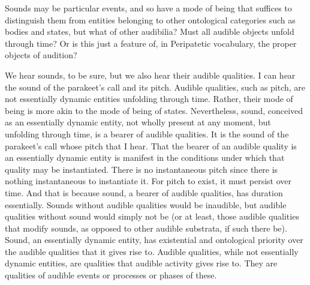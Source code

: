 \documentclass[12pt]{article}
\begin{document}
Sounds may be particular events, and so have a mode of being that suffices to distinguish them from entities belonging to other ontological categories such as bodies and states, but what of other audibilia? Must all audible objects unfold through time? Or is this just a feature of, in Peripatetic vocabulary, the proper objects of audition?

We hear sounds, to be sure, but we also hear their audible qualities. I can hear the sound of the parakeet’s call and its pitch. Audible qualities, such as pitch, are not essentially dynamic entities unfolding through time. Rather, their mode of being is more akin to the mode of being of states. Nevertheless, sound, conceived as an essentially dynamic entity, not wholly present at any moment, but unfolding through time, is a bearer of audible qualities. It is the sound of the parakeet’s call whose pitch that I hear. That the bearer of an audible quality is an essentially dynamic entity is manifest in the conditions under which that quality may be instantiated. There is no instantaneous pitch since there is nothing instantaneous to instantiate it. For pitch to exist, it must persist over time. And that is because sound, a bearer of audible qualities, has duration essentially. Sounds without audible qualities would be inaudible, but audible qualities without sound would simply not be (or at least, those audible qualities that modify sounds, as opposed to other audible substrata, if such there be). Sound, an essentially dynamic entity, has existential and ontological priority over the audible qualities that it gives rise to. Audible qualities, while not essentially dynamic entities, are qualities that audible activity gives rise to. They are qualities of audible events or processes or phases of these.

\end{document}
